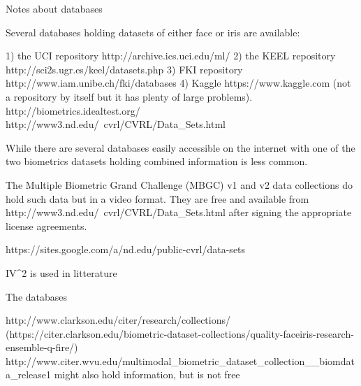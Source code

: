 Notes about databases

Several databases holding datasets of either face or iris are available: 

1) the UCI repository http://archive.ics.uci.edu/ml/
2) the KEEL repository http://sci2s.ugr.es/keel/datasets.php
3) FKI repository http://www.iam.unibe.ch/fki/databases
4) Kaggle https://www.kaggle.com (not a repository by itself but it has plenty of large problems).
http://biometrics.idealtest.org/
http://www3.nd.edu/~cvrl/CVRL/Data_Sets.html


While there are several databases easily accessible on the internet with one of the two biometrics datasets holding combined information is less common. 

The Multiple Biometric Grand Challenge (MBGC) v1 and v2 data collections do hold such data but in a video format. They are free and available from
http://www3.nd.edu/~cvrl/CVRL/Data_Sets.html
after signing the appropriate license agreements.

https://sites.google.com/a/nd.edu/public-cvrl/data-sets

IV^2 is used in litterature 

The databases 

http://www.clarkson.edu/citer/research/collections/
(https://citer.clarkson.edu/biometric-dataset-collections/quality-faceiris-research-ensemble-q-fire/)
http://www.citer.wvu.edu/multimodal_biometric_dataset_collection__biomdata_release1
might also hold information, but is not free 
